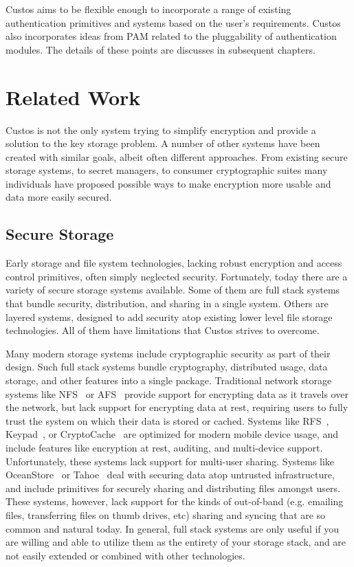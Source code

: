 Custos aims to be flexible enough to incorporate a range of existing
authentication primitives and systems based on the user's
requirements. Custos also incorporates ideas from PAM related to the
pluggability of authentication modules. The details of these points
are discusses in subsequent chapters.

\section{Related Work}

Custos is not the only system trying to simplify encryption and
provide a solution to the key storage problem. A number of other
systems have been created with similar goals, albeit often different
approaches. From existing secure storage systems, to secret managers,
to consumer cryptographic suites many individuals have proposed
possible ways to make encryption more usable and data more easily
secured.

\subsection{Secure Storage}

Early storage and file system technologies, lacking robust encryption
and access control primitives, often simply neglected
security. Fortunately, today there are a variety of secure storage
systems available. Some of them are full stack systems that bundle
security, distribution, and sharing in a single system. Others are
layered systems, designed to add security atop existing lower level
file storage technologies. All of them have limitations that Custos
strives to overcome.

Many modern storage systems include cryptographic security as part of
their design. Such full stack systems bundle cryptography, distributed
usage, data storage, and other features into a single
package. Traditional network storage systems like
NFS~\cite{Sandberg1985} or AFS~\cite{Howard1988} provide support for
encrypting data as it travels over the network, but lack support for
encrypting data at rest, requiring users to fully trust the system on
which their data is stored or cached. Systems like
RFS~\cite{Dong2011}, Keypad~\cite{Geambasu2011}, or
CryptoCache~\cite{Jensen2000} are optimized for modern mobile device
usage, and include features like encryption at rest, auditing, and
multi-device support. Unfortunately, these systems lack support for
multi-user sharing. Systems like OceanStore~\cite{Kubiatowicz2000} or
Tahoe~\cite{Wilcox-O'Hearn2008} deal with securing data atop untrusted
infrastructure, and include primitives for securely sharing and
distributing files amongst users. These systems, however, lack support
for the kinds of out-of-band (e.g. emailing files, transferring files
on thumb drives, etc) sharing and syncing that are so common and
natural today. In general, full stack systems are only useful if you
are willing and able to utilize them as the entirety of your storage
stack, and are not easily extended or combined with other
technologies.

